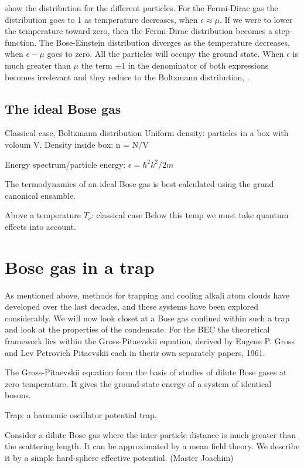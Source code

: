  show the distribution for the different particles. For the Fermi-Dirac gas the distribution goes to 1 as temperature decreases, when $\epsilon \approx \mu$. If we were to lower the temperature toward zero, then the Fermi-Dirac distribution becomes a step-function. 
The Bose-Einstein distribution diverges as the temperature decreases, when $\epsilon - \mu$ goes to zero. All the particles will occupy the ground state. 
When $\epsilon$ is much greater than $\mu$ the term $\pm 1$ in the denominator of both expressions becomes irrelevant and they reduce to the Boltzmann distribution, \cite{ThermalPhysics}.

\subsection{The ideal Bose gas}

Classical case, Boltzmann distribution
Uniform density: particles in a box with voloum V.
Density inside box: n = N/V

Energy spectrum/particle energy: $\epsilon = \hbar^2 k^2/2m$

The termodynamics of an ideal Bose gas is best calculated using the grand canonical ensamble.

Above a temperature $T_c$: classical case
Below this temp we must take quantum effects into account. 



\section{Bose gas in a trap}

As mentioned above, methods for trapping and cooling alkali atom clouds have developed over the last decades, and these systems have been explored considerably. We will now look closet at a Bose gas confined within such a trap and look at the properties of the condensate.
For the BEC the theoretical framework lies within the Gross-Pitaevskii equation, derived by Eugene P. Gross and Lev Petrovich Pitaevskii each in therir own separately papers, 1961.

The Gross-Pitaevskii equation form the basis of studies of dilute Bose gases at zero temperature. It gives the ground-state energy of a system of identical bosons.

Trap: a harmonic oscillator potential trap. 

Consider a dilute Bose gas where the inter-particle distance is much greater than the scattering length. It can be approximated by a mean field theory. We describe it by a simple hard-sphere effective potential. (Master Joachim)


